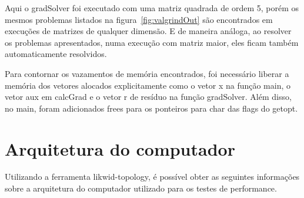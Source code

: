 \documentclass[12pt]{article}
\begin{document}
Aqui o gradSolver foi executado com uma matriz quadrada de ordem 5, porém os
mesmos problemas listados na figura~\ref{fig:valgrindOut} são encontrados em
execuções de matrizes de qualquer dimensão. E de maneira análoga, ao resolver os
problemas apresentados, numa execução com matriz maior, eles ficam também
automaticamente resolvidos.

Para contornar os vazamentos de memória encontrados, foi necessário liberar a
memória dos vetores alocados explicitamente como o vetor x na função main, o
vetor aux em calcGrad e o vetor r de resíduo na função gradSolver. Além disso,
no main, foram adicionados frees para os ponteiros para char das flags do
getopt.

\section{Arquitetura do computador}\label{sec:likwid}

Utilizando a ferramenta likwid-topology, é possível obter as seguintes
informações sobre a arquitetura do computador utilizado para os testes de
performance.
\end{document}
